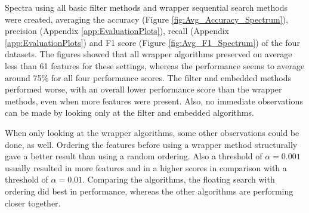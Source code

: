 \documentclass[10pt,a4paper]{report}
\begin{document}
	Spectra using all basic filter methods and wrapper sequential search methods were created, averaging the accuracy (Figure \ref{fig:Avg_Accuracy_Spectrum}), precision (Appendix \ref{app:EvaluationPlots}), recall (Appendix \ref{app:EvaluationPlots}) and F1 score (Figure \ref{fig:Avg_F1_Spectrum}) of the four datasets. The figures showed that all wrapper algorithms preserved on average less than 61 features for these settings, whereas the performance seems to average around 75\% for all four performance scores. The filter and embedded methods performed worse, with an overall lower performance score than the wrapper methods, even when more features were present. Also, no immediate observations can be made by looking only at the filter and embedded algorithms.
	
	When only looking at the wrapper algorithms, some other observations could be done, as well. Ordering the features before using a wrapper method structurally gave a better result than using a random ordering. Also a threshold of $\alpha = 0.001$ usually resulted in more features and in a higher scores in comparison with a threshold of $\alpha = 0.01$. Comparing the algorithms, the floating search with ordering did best in performance, whereas the other algorithms are performing closer together.
	
\end{document}
